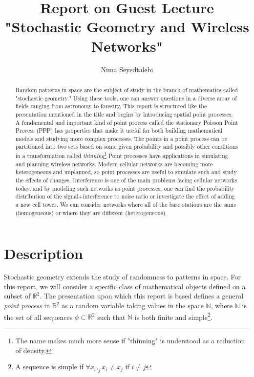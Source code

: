 \documentclass[]{article}
\title{Report on Guest Lecture "Stochastic Geometry and Wireless Networks"}
\author{Nima Seyedtalebi}
\begin{document}
\maketitle

\begin{abstract}
Random patterns in space are the subject of study in the branch of mathematics called "stochastic geometry." Using these tools, one can answer questions in a diverse array of fields ranging from astronomy to forestry. This report is structured like the presentation mentioned in the title and begins by introducing spatial point processes. A fundamental and important kind of point process called the stationary Poisson Point Process (PPP) has properties that make it useful for both building mathematical models and studying more complex processes. The points in a point process can be partitioned into two sets based on some given probability and possibly other conditions in a transformation called \textit{thinning}\footnote{The name makes much more sense if "thinning" is understood as a reduction of density.}
Point processes have applications in simulating and planning wireless networks. Modern cellular networks are becoming more heterogeneous and unplanned, so point processes are useful to simulate such and study the effects of changes. Interference is one of the main problems facing cellular networks today, and by modeling such networks as point processes, one can find the probability distribution of the signal+interference to noise ratio or investigate the effect of adding a new cell tower. We can consider networks where all of the base stations are the same (homogeneous) or where they are different (heterogeneous).
\end{abstract}

\section{Description}
Stochastic geometry extends the study of randomness to patterns in space. For this report, we will consider a specific class of mathematical objects defined on a subset of $\mathbb{R}^2$.  The presentation upon which this report is based defines a general \textit{point process} in $\mathbb{R}^2$ as a random variable taking values in the space $\mathbb{N}$, where $\mathbb{N}$ is the set of all sequences $\phi \subset \mathbb{R}^2$ such that $\mathbb{N}$ is both finite and simple\footnote{A sequence is simple if $\forall x_i,_j x_i \neq x_j$ if $i \neq j$}.
\end{document}
